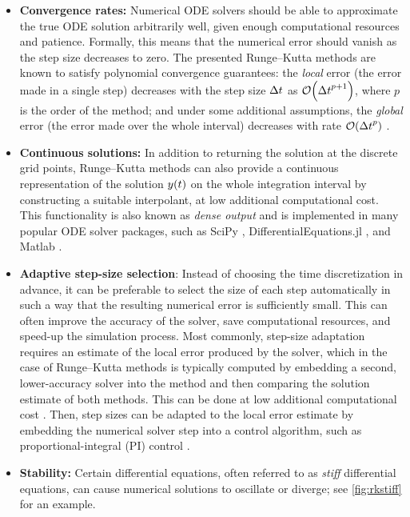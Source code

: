 \documentclass{mimosis}
\begin{document}
\begin{itemize}[left=0pt .. \parindent]
\item \textbf{Convergence rates:}
Numerical ODE solvers should be able to approximate the true ODE solution arbitrarily well, given enough computational resources and patience.
Formally, this means that the numerical error should vanish as the step size decreases to zero.
The presented Runge--Kutta methods are known to satisfy polynomial convergence guarantees:
the \emph{local} error (the error made in a single step) decreases with the step size \({\Delta t}\) as \(\order{\dt^{p+1}}\), where \(p\) is the order of the method;
and under some additional assumptions, the \emph{global} error (the error made over the whole interval) decreases with rate \(\order{\dt^p}\)
\parencite[Section II.3]{hairer2008solving}.
\item \textbf{Continuous solutions:}
In addition to returning the solution at the discrete grid points, Runge--Kutta methods can also provide a continuous representation of the solution \(y(t)\) on the whole integration interval by constructing a suitable interpolant, at low additional computational cost.
This functionality is also known as \emph{dense output} \parencite[Section II.6]{hairer2008solving}
and is
implemented in many popular ODE solver packages, such as SciPy \parencite{2020SciPy}, DifferentialEquations.jl \parencite{rackauckas2017differentialequations}, and Matlab \parencite{shampine1997matlab}.
\item \textbf{Adaptive step-size selection}:
Instead of choosing the time discretization in advance, it can be preferable to select the size of each step automatically in such a way that the resulting numerical error is sufficiently small.
This can often improve the accuracy of the solver, save computational resources, and speed-up the simulation process.
Most commonly, step-size adaptation requires an estimate of the local error produced by the solver, which in the case of Runge--Kutta methods is typically computed by embedding a second, lower-accuracy solver into the method and then comparing the solution estimate of both methods.
This can be done at low additional computational cost
\parencite[Section II.4]{hairer2008solving}.
Then, step sizes can be adapted to the local error estimate by embedding the numerical solver step into a control algorithm, such as proportional-integral (PI) control \parencite{Gustafsson1988}.
\item \textbf{Stability:}
Certain differential equations, often referred to as \emph{stiff} differential equations, can cause numerical solutions to oscillate or diverge; see \cref{fig:rkstiff} for an example.

\end{itemize}
\end{document}
